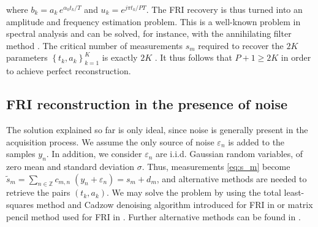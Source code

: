 \documentclass{article}
\begin{document}
\noindent
where $b_k = a_k \, e^{\alpha_0 t_k / T}$ and $u_k = e^{j \pi t_k / PT}$.
The FRI recovery is thus turned into an amplitude and frequency estimation problem. 
This is a well-known problem in spectral analysis and can be solved, for instance, 
with the annihilating filter method \cite{stoica2005}. The critical number of measurements 
$s_m$ required to recover the $2K$ parameters $\left\lbrace t_k, a_k \right\rbrace_{k=1}^{K}$ 
is exactly $2K$ \cite{dragotti2007}. 
It thus follows that $P+1 \geq 2K$ in order to achieve perfect reconstruction.


\subsection{FRI reconstruction in the presence of noise}
\label{subsec:noise}
The solution explained so far is only ideal, since noise is generally present in the acquisition 
process. We assume the only source of noise $\varepsilon_n$ is added to the samples $y_n$. 
In addition, we consider $\varepsilon_n$ are i.i.d. Gaussian random variables, of zero mean and 
standard deviation $\sigma$. Thus, measurements \eqref{eq:s_m} become
$\tilde{s}_m = \sum_{n \in \mathbb{Z}} c_{m,n} \; (y_n + \varepsilon_n) = s_m + d_m$,
and alternative methods are needed to retrieve the pairs $(t_k,a_k)$. We may solve the problem 
by using the total least-squares method and Cadzow denoising algorithm \cite{cadzow1988} introduced 
for FRI in \cite{blu2008} or matrix pencil method \cite{hua1990} used for FRI in \cite{maravic2005}.
Further alternative methods can be found in \cite{tan2008,erdozain2011,berent2010}.


%
%
\end{document}
